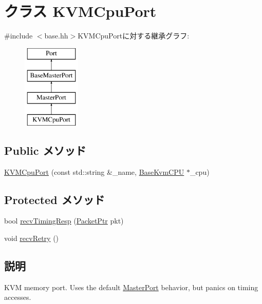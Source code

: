 \hypertarget{classBaseKvmCPU_1_1KVMCpuPort}{
\section{クラス KVMCpuPort}
\label{classBaseKvmCPU_1_1KVMCpuPort}
}


{\ttfamily \#include $<$base.hh$>$}KVMCpuPortに対する継承グラフ:\begin{figure}[H]
\begin{center}
\leavevmode
\includegraphics[height=4cm]{classBaseKvmCPU_1_1KVMCpuPort}
\end{center}
\end{figure}
\subsection*{Public メソッド}
\begin{DoxyCompactItemize}
\item 
\hyperlink{classBaseKvmCPU_1_1KVMCpuPort_ab931237cb0e359b959dda61ba1bcc011}{KVMCpuPort} (const std::string \&\_\-name, \hyperlink{classBaseKvmCPU_1_1BaseKvmCPU}{BaseKvmCPU} $\ast$\_\-cpu)
\end{DoxyCompactItemize}
\subsection*{Protected メソッド}
\begin{DoxyCompactItemize}
\item 
bool \hyperlink{classBaseKvmCPU_1_1KVMCpuPort_a482dba5588f4bee43e498875a61e5e0b}{recvTimingResp} (\hyperlink{classPacket}{PacketPtr} pkt)
\item 
void \hyperlink{classBaseKvmCPU_1_1KVMCpuPort_a29cb5a4f98063ce6e9210eacbdb35298}{recvRetry} ()
\end{DoxyCompactItemize}


\subsection{説明}
KVM memory port. Uses the default \hyperlink{classMasterPort}{MasterPort} behavior, but panics on timing accesses. 

